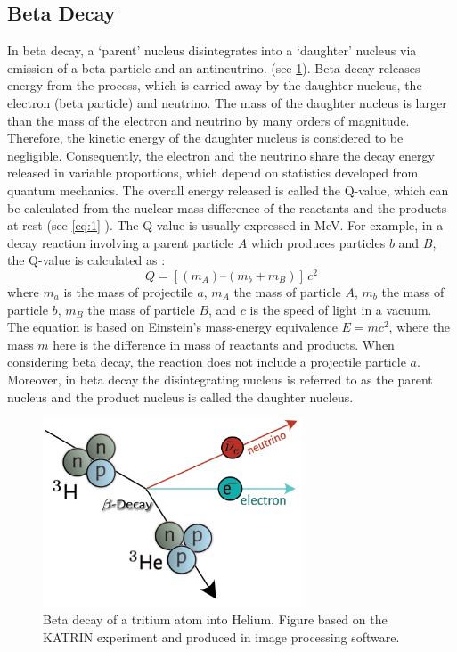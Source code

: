 \documentclass[a4paper,12pt, notitlepage]{article}
\begin{document}
\subsection{Beta Decay}
In beta decay, a `parent' nucleus disintegrates into a `daughter' nucleus via emission of a beta particle and an antineutrino. (see \cref{fig:fig01}).
Beta decay releases energy from the process, which is carried away by the daughter nucleus, the electron (beta particle) and neutrino. The mass of the daughter nucleus is larger than the mass of the electron and neutrino by many orders of magnitude. Therefore, the kinetic energy of the daughter nucleus is considered to be negligible. Consequently, the electron and the neutrino share the decay energy released in variable proportions, which depend on statistics developed from quantum mechanics. The overall energy released is called the Q-value, which can be calculated from the nuclear mass difference of the reactants and the products at rest (see \cref{eq:1} ). The Q-value is usually expressed in MeV. 
For example, in a decay reaction involving a parent particle $A$ which produces particles $b$ and $B$, the Q-value is calculated as \cite{zuber2011neutrino}:
\begin{equation}\label{eq:1}
    Q = \left[\left(m_A\right) – \left(m_b + m_B\right)\right]\,c^{2}
\end{equation}
where $m_a$ is the mass of projectile $a$, $m_A$ the mass of particle $A$, $m_b$ the mass of particle $b$, $m_B$ the mass of particle $B$, and $c$ is the speed of light in a vacuum. The equation is based on Einstein's mass-energy equivalence $E = m c^{2}$, where the mass $m$ here is the difference in mass of reactants and products. When considering beta decay, the reaction does not include a projectile particle $a$. Moreover, in beta decay the disintegrating nucleus is referred to as the parent nucleus and the product nucleus is called the daughter nucleus. 

\begin{figure}[hbt!]
\centering
\includegraphics[width=77mm]{pictures/betaDecay.png}
\vspace{-2mm}
\caption{Beta decay of a tritium atom into Helium. Figure based on the KATRIN experiment \cite{steidl} and produced in image processing software.}
\label{fig:fig01}
\end{figure}
\end{document}
